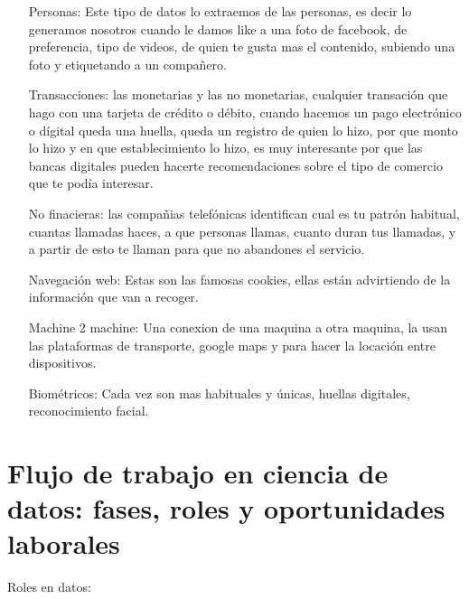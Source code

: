 \begin{enumerate}
	\item[Personas:] Este tipo de datos lo extraemos de las personas, es decir lo generamos nosotros cuando le damos like a una foto de facebook, de preferencia, tipo de videos, de quien te gusta mas el contenido, subiendo una foto y etiquetando a un compa\~nero.
	\item[Transacciones:] las monetarias y las no monetarias, cualquier transaci\'on que hago con una tarjeta de cr\'edito o d\'ebito, cuando hacemos un pago electr\'onico o d\'igital  queda una huella, queda un registro de quien lo hizo, por que monto lo hizo y en que establecimiento lo hizo, es muy interesante por que las bancas digitales pueden hacerte recomendaciones sobre el tipo de comercio que te pod\'ia interesar.

		No finacieras: las compa\~nias telef\'onicas identifican cual es tu patr\'on habitual, cuantas llamadas haces, a que personas llamas, cuanto duran tus llamadas, y a partir de esto te llaman para que no abandones el servicio.

	\item[Navegaci\'on web: ] Estas son las famosas cookies, ellas est\'an advirtiendo de la informaci\'on que van a recoger.

	\item[Machine 2 machine: ] Una conexion de una maquina a otra maquina, la usan las plataformas de transporte, google maps y para hacer la locaci\'on entre dispositivos.

	\item[Biom\'etricos: ] Cada vez son mas habituales y \'unicas, huellas digitales, reconocimiento facial.

\end{enumerate}

\section{Flujo de trabajo en ciencia de datos: fases, roles y oportunidades laborales}

Roles en datos:

